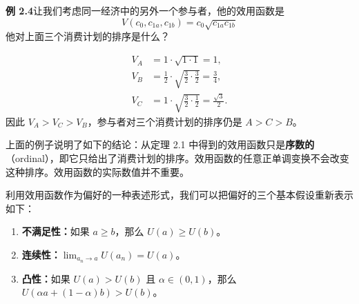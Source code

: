 \begin{tcolorbox}[knowledge,title=2.2 经济参与者]
\begin{enumerate}
\begin{tcolorbox}[example]
        \begin{question}
            \textbf{例 2.4}\quad 让我们考虑同一经济中的另外一个参与者，他的效用函数是
            \[
                V(c_0,c_{1a},c_{1b})=c_0\sqrt{c_{1a}c_{1b}}
            \]
            他对上面三个消费计划的排序是什么？
        \end{question}
        \begin{solution}
            \[
                \begin{aligned}
                    V_A &= 1\cdot\sqrt{1\cdot 1}=1,\\
                    V_B &= \tfrac12\cdot\sqrt{\tfrac32\cdot\tfrac32}=\tfrac34,\\
                    V_C &= 1\cdot\sqrt{\tfrac32\cdot\tfrac12}=\tfrac{\sqrt3}{2}.
                \end{aligned}
            \]
            因此 $V_A>V_C>V_B$，参与者对三个消费计划的排序仍是 $A>C>B$。
        \end{solution}
    \end{tcolorbox}
\end{enumerate}

上面的例子说明了如下的结论：从定理 2.1 中得到的效用函数只是\textbf{序数的}（ordinal），即它只给出了消费计划的排序。效用函数的任意正单调变换不会改变这种排序。效用函数的实际数值并不重要。

利用效用函数作为偏好的一种表述形式，我们可以把偏好的三个基本假设重新表示如下：
\begin{enumerate}
    \item \textbf{不满足性：}如果 $a\ge b$，那么 $U(a)\ge U(b)$。
    \item \textbf{连续性：}$\lim_{a_n \to a}U(a_n)=U(a)$。
    \item \textbf{凸性：}如果 $U(a)>U(b)$ 且 $\alpha\in(0,1)$，那么 $U(\alpha a+(1-\alpha)b)>U(b)$。
\end{enumerate}

\end{tcolorbox}



